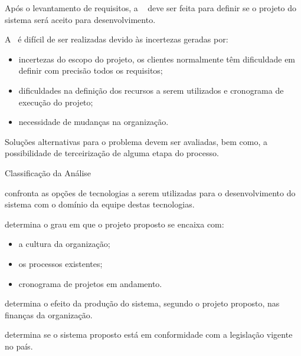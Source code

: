 
\lecturetitle{\course}{\insertlecture}

\frame{\maketitle}

\begin{frame}{\insertlecture}
  
  Após o levantamento de requisitos, a \alert{\insertlecture\ } deve ser
  feita para definir se o projeto do sistema será aceito para
  desenvolvimento.\bigskip\pause
  
  A \insertlecture\ é difícil de ser realizadas devido às incertezas geradas por:
  \begin{itemize}[<+->]
  \item incertezas do escopo do projeto, os \alert{clientes} normalmente têm 
    dificuldade em definir com precisão todos os requisitos;
  \item dificuldades na definição dos \alert{recursos} a serem utilizados e
    \alert{cronograma} de execução do projeto;
  \item necessidade de \alert{mudanças} na organização.
  \end{itemize}

  \bigskip\pause Soluções \alert{alternativas} para o problema devem
  ser avaliadas, bem como, a possibilidade de terceirização de alguma
  etapa do processo.

\end{frame}

\begin{frame}{Classificação da Análise}\small
  \begin{description}[<+->]
  \item[Viabilidade técnica:] confronta as opções de tecnologias 
    a serem utilizadas para o desenvolvimento do sistema com o 
    domínio da equipe destas tecnologias.
  \item[Viabilidade operacional:] determina o grau em que o projeto proposto 
    se encaixa com:
    \begin{itemize}[<+->]
      \item a cultura da organização;
      \item os processos existentes;
      \item cronograma de projetos em andamento.
      \end{itemize}
    \item[Viabilidade econômica:] determina o efeito da produção do sistema, 
    segundo o projeto proposto, nas finanças da organização.
  \item[Viabilidade legal:] determina se o sistema proposto está em conformidade 
    com a legislação vigente no país.
  \end{description}
\end{frame}

